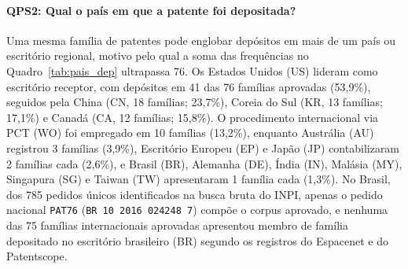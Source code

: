 \documentclass[12pt,a4paper]{article}
\begin{document}
\paragraph{QPS2: Qual o país em que a patente foi depositada?}
Uma mesma família de patentes pode englobar depósitos em mais de um país ou escritório regional, motivo pelo qual a soma das frequências no Quadro~\ref{tab:pais_dep} ultrapassa 76. Os Estados Unidos (US) lideram como escritório receptor, com depósitos em 41 das 76 famílias aprovadas (53,9\%), seguidos pela China (CN, 18 famílias; 23,7\%), Coreia do Sul (KR, 13 famílias; 17,1\%) e Canadá (CA, 12 famílias; 15,8\%). O procedimento internacional via PCT (WO) foi empregado em 10 famílias (13,2\%), enquanto Austrália (AU) registrou 3 famílias (3,9\%), Escritório Europeu (EP) e Japão (JP) contabilizaram 2 famílias cada (2,6\%), e Brasil (BR), Alemanha (DE), Índia (IN), Malásia (MY), Singapura (SG) e Taiwan (TW) apresentaram 1 família cada (1,3\%). No Brasil, dos 785 pedidos únicos identificados na busca bruta do INPI, apenas o pedido nacional \texttt{PAT76} (\texttt{BR 10 2016 024248 7}) compõe o corpus aprovado, e nenhuma das 75 famílias internacionais aprovadas apresentou membro de família depositado no escritório brasileiro (BR) segundo os registros do Espacenet e do Patentscope.
\end{document}
